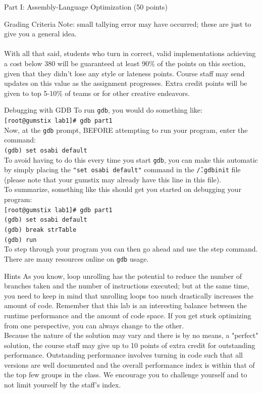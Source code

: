 \documentclass{article}
\begin{document}
\begin{section}{Part I: Assembly-Language Optimization (50 points)}
\begin{subsection}{Grading Criteria}
        \noindent
        Note: small tallying error may have occurred; these are just to give you a general idea. \\ \\
        \noindent
        With all that said, students who turn in correct, valid implementations achieving a cost below 380 will be guaranteed at least 90\% of the points on this section, given that they didn't lose any style or lateness points. Course staff may send updates on this value as the assignment progresses. Extra credit points will be given to top 5-10\% of teams or for other creative endeavors.
        \end{subsection}
        \begin{subsection}{Debugging with GDB}
        To run \texttt{gdb}, you would do something like:\\
        \texttt{[root@gumstix lab1]\# gdb part1}\\
        \noindent
        Now, at the \texttt{gdb} prompt, BEFORE attempting to run your program, enter the command:\\
        \texttt{(gdb) set osabi default} \\
        To avoid having to do this every time you start \texttt{gdb}, you can make this automatic by simply placing the \texttt{"set osabi default"} command in the \texttt{\~/.gdbinit} file (please note that your gumstix may already have this line in this file). \\
        \noindent
        To summarize, something like this should get you started on debugging your program:\\
        \texttt{[root@gumstix lab1]\# gdb part1\\
        (gdb) set osabi default \\
        (gdb) break strTable \\
        (gdb) run \\
        }
        To step through your program you can then go ahead and use the step command. There are many
resources online on \texttt{gdb} usage.
        \end{subsection}
        \begin{subsection}{Hints}
        As you know, loop unrolling has the potential to reduce the number of branches taken and the number of instructions executed; but at the same time, you need to keep in mind that unrolling loops too much drastically increases the amount of code. Remember that this lab is an interesting balance between the runtime performance and the amount of code space. If you get stuck optimizing from one perspective, you can always change to the other.\\
        Because the nature of the solution may vary and there is by no means, a "perfect" solution, the course staff may give up to 10 points of extra credit for outstanding performance. Outstanding performance involves turning in code such that all versions are well documented and the overall performance index is within that of the top few groups in the class. We encourage you to challenge yourself and to not limit yourself by the staff's index.


\end{subsection}
\end{section}
\end{document}
